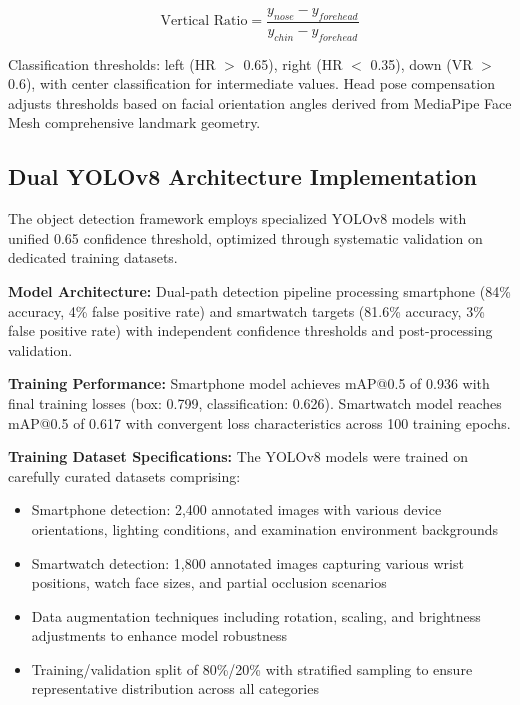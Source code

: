 \documentclass[conference]{IEEEtran}
\begin{document}
\begin{equation}
\text{Vertical Ratio} = \frac{y_{nose} - y_{forehead}}{y_{chin} - y_{forehead}}
\end{equation}

Classification thresholds: left (HR $>$ 0.65), right (HR $<$ 0.35), down (VR $>$ 0.6), 
with center classification for intermediate values. Head pose compensation adjusts 
thresholds based on facial orientation angles derived from MediaPipe Face Mesh 
comprehensive landmark geometry.

\subsection{Dual YOLOv8 Architecture Implementation}

The object detection framework employs specialized YOLOv8 models with unified 0.65 
confidence threshold, optimized through systematic validation on dedicated training 
datasets.

\textbf{Model Architecture:} Dual-path detection pipeline processing smartphone (84\% 
accuracy, 4\% false positive rate) and smartwatch targets (81.6\% accuracy, 3\% false 
positive rate) with independent confidence thresholds and post-processing validation.

\textbf{Training Performance:} Smartphone model achieves mAP@0.5 of 0.936 with final 
training losses (box: 0.799, classification: 0.626). Smartwatch model reaches mAP@0.5 
of 0.617 with convergent loss characteristics across 100 training epochs.

\textbf{Training Dataset Specifications:} The YOLOv8 models were trained on carefully 
curated datasets comprising:
\begin{itemize}
    \item Smartphone detection: 2,400 annotated images with various device orientations, 
    lighting conditions, and examination environment backgrounds
    \item Smartwatch detection: 1,800 annotated images capturing various wrist positions, 
    watch face sizes, and partial occlusion scenarios
    \item Data augmentation techniques including rotation, scaling, and brightness 
    adjustments to enhance model robustness
    \item Training/validation split of 80\%/20\% with stratified sampling to ensure 
    representative distribution across all categories
\end{itemize}
\end{document}
